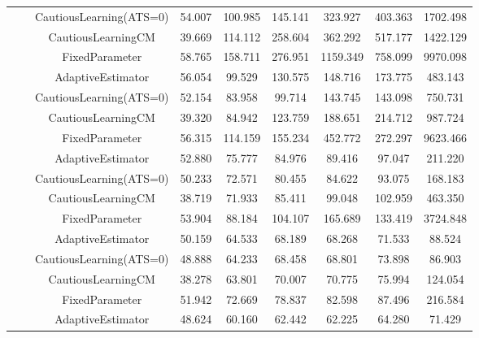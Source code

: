 \begin{table}[!h]
\begin{tabular}[t]{ccccccccc}
 &  & CautiousLearning(ATS=0) & 54.007 & 100.985 & 145.141 & 323.927 & 403.363 & 1702.498\\

 &  & CautiousLearningCM & 39.669 & 114.112 & 258.604 & 362.292 & 517.177 & 1422.129\\

 & \multirow[t]{-4}{*}{\centering\arraybackslash 0.25} & FixedParameter & 58.765 & 158.711 & 276.951 & 1159.349 & 758.099 & 9970.098\\
\cmidrule{2-9}
 &  & AdaptiveEstimator & 56.054 & 99.529 & 130.575 & 148.716 & 173.775 & 483.143\\

 &  & CautiousLearning(ATS=0) & 52.154 & 83.958 & 99.714 & 143.745 & 143.098 & 750.731\\

 &  & CautiousLearningCM & 39.320 & 84.942 & 123.759 & 188.651 & 214.712 & 987.724\\

 & \multirow[t]{-4}{*}{\centering\arraybackslash 0.35} & FixedParameter & 56.315 & 114.159 & 155.234 & 452.772 & 272.297 & 9623.466\\
\cmidrule{2-9}
 &  & AdaptiveEstimator & 52.880 & 75.777 & 84.976 & 89.416 & 97.047 & 211.220\\

 &  & CautiousLearning(ATS=0) & 50.233 & 72.571 & 80.455 & 84.622 & 93.075 & 168.183\\

 &  & CautiousLearningCM & 38.719 & 71.933 & 85.411 & 99.048 & 102.959 & 463.350\\

 & \multirow[t]{-4}{*}{\centering\arraybackslash 0.50} & FixedParameter & 53.904 & 88.184 & 104.107 & 165.689 & 133.419 & 3724.848\\
\cmidrule{2-9}
 &  & AdaptiveEstimator & 50.159 & 64.533 & 68.189 & 68.268 & 71.533 & 88.524\\

 &  & CautiousLearning(ATS=0) & 48.888 & 64.233 & 68.458 & 68.801 & 73.898 & 86.903\\

 &  & CautiousLearningCM & 38.278 & 63.801 & 70.007 & 70.775 & 75.994 & 124.054\\

 & \multirow[t]{-4}{*}{\centering\arraybackslash 0.75} & FixedParameter & 51.942 & 72.669 & 78.837 & 82.598 & 87.496 & 216.584\\
\cmidrule{2-9}
 &  & AdaptiveEstimator & 48.624 & 60.160 & 62.442 & 62.225 & 64.280 & 71.429\\


\end{tabular}
\end{table}
